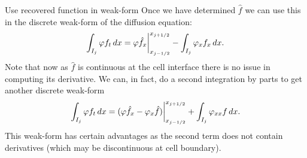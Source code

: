 \documentclass[aspectratio=169]{beamer}
\begin{document}
\begin{frame}{Use recovered function in weak-form}
  Once we have determined $\hat{f}$ we can use this in the discrete
  weak-form of the diffusion equation:
  \begin{align*}
    \int_{I_j} \varphi f_t \thinspace dx =   \varphi \hat{f}_x \bigg|^{x_{j+1/2}}_{x_{j-1/2}}
    -
    \int_{I_j} \varphi_{x} f_x \thinspace dx.
  \end{align*}
  Note that now as $\hat{f}$ is continuous at the cell interface there
  is no issue in computing its derivative. We can, in fact, do a
  second integration by parts to get another discrete weak-form
  \begin{align*}
    \int_{I_j} \varphi f_t \thinspace dx =   (\varphi \hat{f}_x - \varphi_x \hat{f})\bigg|^{x_{j+1/2}}_{x_{j-1/2}}
    +
    \int_{I_j} \varphi_{xx} f \thinspace dx.
  \end{align*}
  This weak-form has certain advantages as the second term does not
  contain derivatives (which may be discontinuous at cell
  boundary).
\end{frame}
\end{document}
